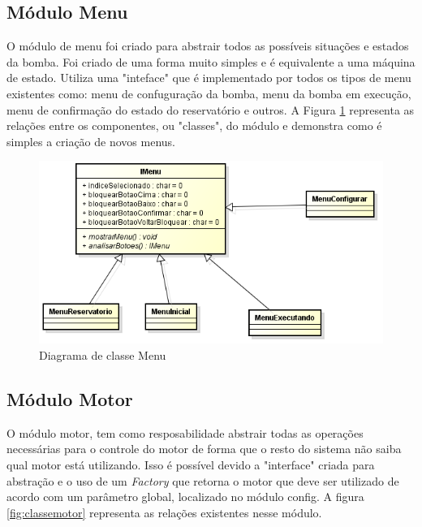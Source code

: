 \subsection{Módulo Menu}

O módulo de menu foi criado para abstrair todos as possíveis situações e estados da bomba. Foi criado de uma forma muito simples e é equivalente a uma máquina de estado. Utiliza uma "inteface" que é implementado por todos os tipos de menu existentes como: menu de confuguração da bomba, menu da bomba em execução, menu de confirmação do estado do reservatório e outros. A Figura \ref{fig:classemenu} representa as relações entre os componentes, ou "classes", do módulo e demonstra como é simples a criação de novos menus.

\begin{figure}[htp]
	\centering
	\includegraphics[scale=1]{images/classe_menu.png}
	\caption{Diagrama de classe Menu}	
	\label{fig:classemenu}
\end{figure}

\subsection{Módulo Motor}

O módulo motor, tem como resposabilidade abstrair todas as operações necessárias para o controle do motor de forma que o resto do sistema não saiba qual motor está utilizando. Isso é possível devido a "interface" criada para abstração e o uso de um \emph{Factory} que retorna o motor que deve ser utilizado de acordo com um parâmetro global, localizado no módulo config. A figura \ref{fig:classemotor} representa as relações existentes nesse módulo. \newpage


